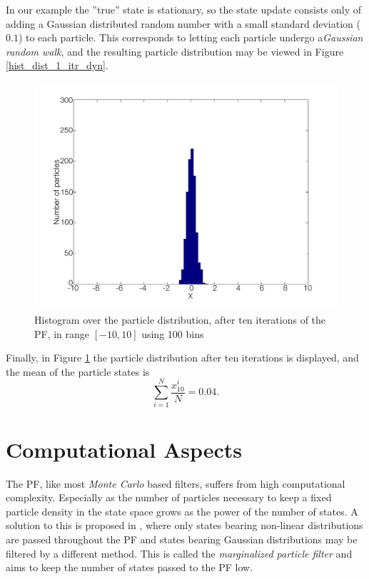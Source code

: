 \documentclass{LTHthesis}
\begin{document}
In our example the ''true'' state is stationary, so the state update consists only of adding a Gaussian distributed random number with a small standard deviation ($0.1$) to each particle. This corresponds to letting each particle undergo a\emph{Gaussian random walk}, and the resulting particle distribution may be viewed in Figure \ref{hist_dist_1_itr_dyn}.
%
\begin{figure}[!hbt]

\includegraphics[width=1\textwidth ]{images/PF/hist_dist_10_itr}
\caption{Histogram over the particle distribution, after ten iterations of the PF, in range $[-10,10]$ using 100 bins}\label{hist_dist_10_itr}
\end{figure}

Finally, in Figure \ref{hist_dist_10_itr} the particle distribution after ten iterations is displayed, and the mean of the particle states is
\begin{equation}
\sum^{N}_{i=1}{\frac{x^i_{10}}{N}} = 0.04.
\end{equation} 
%
\section{Computational Aspects}
\label{sec:com_asp}
%
The PF, like most \emph{Monte Carlo} based filters, suffers from high computational complexity. Especially as the number of particles necessary to keep a fixed particle density in the state space grows as the power of the number of states. A solution to this is proposed in \cite{gson12}, where only states bearing non-linear distributions are passed throughout the PF and states bearing Gaussian distributions may be filtered by a different method. This is called the \emph{marginalized particle filter} and aims to keep the number of states passed to the PF low. 
\end{document}
